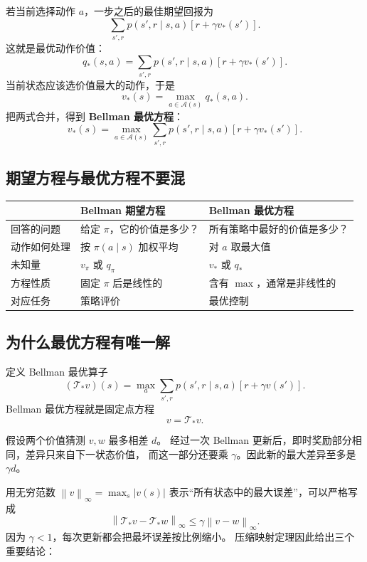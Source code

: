 \documentclass[11pt,a4paper,fontset=fandol]{ctexart}
\newcommand{\Aset}{\mathcal{A}}
\newcommand{\vstar}{v_*}
\newcommand{\qstar}{q_*}
\newcommand{\Tstar}{\mathcal{T}_*}
\newcommand{\norminf}[1]{\left\lVert #1\right\rVert_\infty}
\begin{document}
若当前选择动作 \(a\)，一步之后的最佳期望回报为
\[
\sum_{s',r}p(s',r\mid s,a)
\left[r+\gamma\vstar(s')\right].
\]
这就是最优动作价值：
\[
\boxed{
\qstar(s,a)
=
\sum_{s',r}p(s',r\mid s,a)
\left[r+\gamma\vstar(s')\right]
}.
\]
当前状态应该选价值最大的动作，于是
\[
\boxed{
\vstar(s)=\max_{a\in\Aset(s)}\qstar(s,a)
}.
\]
把两式合并，得到 \textbf{Bellman 最优方程}：
\[
\boxed{
\vstar(s)
=
\max_{a\in\Aset(s)}
\sum_{s',r}p(s',r\mid s,a)
\left[r+\gamma\vstar(s')\right]
}.
\]

\subsection{期望方程与最优方程不要混}

\begin{center}
\begin{tabularx}{\textwidth}{>{\raggedright\arraybackslash}p{}XX}
\toprule
 & Bellman 期望方程 & Bellman 最优方程\\
\midrule
回答的问题 &
给定 \(\pi\)，它的价值是多少？ &
所有策略中最好的价值是多少？\\
动作如何处理 &
按 \(\pi(a\mid s)\) 加权平均 &
对 \(a\) 取最大值\\
未知量 &
\(v_\pi\) 或 \(q_\pi\) &
\(v_*\) 或 \(q_*\)\\
方程性质 &
固定 \(\pi\) 后是线性的 &
含有 \(\max\)，通常是非线性的\\
对应任务 &
策略评价 &
最优控制\\
\bottomrule
\end{tabularx}
\end{center}

\subsection{为什么最优方程有唯一解}

定义 Bellman 最优算子
\[
(\Tstar v)(s)
=
\max_a\sum_{s',r}p(s',r\mid s,a)
\left[r+\gamma v(s')\right].
\]
Bellman 最优方程就是固定点方程
\[
v=\Tstar v.
\]

\begin{intuitionbox}[“压缩”是什么意思？]
假设两个价值猜测 \(v,w\) 最多相差 \(d\)。
经过一次 Bellman 更新后，即时奖励部分相同，差异只来自下一状态价值，
而这一部分还要乘 \(\gamma\)。因此新的最大差异至多是 \(\gamma d\)。
\end{intuitionbox}

用无穷范数
\(\norminf{v}=\max_s|v(s)|\) 表示“所有状态中的最大误差”，可以严格写成
\[
\boxed{
\norminf{\Tstar v-\Tstar w}
\leq
\gamma\norminf{v-w}
}.
\]
因为 \(\gamma<1\)，每次更新都会把最坏误差按比例缩小。
压缩映射定理因此给出三个重要结论：
\end{document}
